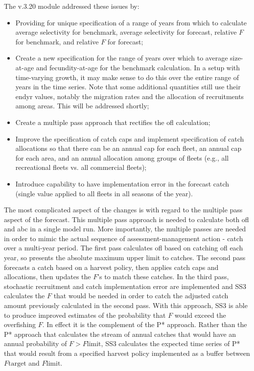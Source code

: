 The v.3.20 module addressed these issues by:
\begin{itemize}
	\item Providing for unique specification of a range of years from which to calculate average selectivity for benchmark, average selectivity for forecast, relative $F$ for benchmark, and relative $F$ for forecast;
	\item Create a new specification for the range of years over which to average size-at-age and fecundity-at-age for the benchmark calculation. In a setup with time-varying growth, it may make sense to do this over the entire range of years in the time series. Note that some additional quantities still use their endyr values, notably the migration rates and the allocation of recruitments among areas. This will be addressed shortly;
	\item Create a multiple pass approach that rectifies the \gls{ofl} calculation;
	\item Improve the specification of catch caps and implement specification of catch allocations so that there can be an annual cap for each fleet, an annual cap for each area, and an annual allocation among groups of fleets (e.g., all recreational fleets vs. all commercial fleets);
	\item Introduce capability to have implementation error in the forecast catch (single value applied to all fleets in all seasons of the year).
\end{itemize}

The most complicated aspect of the changes is with regard to the multiple pass aspect of the forecast. This multiple pass approach is needed to calculate both \gls{ofl} and \gls{abc} in a single model run. More importantly, the multiple passes are needed in order to mimic the actual sequence of assessment-management action - catch over a multi-year period. The first pass calculates \gls{ofl} based on catching \gls{ofl} each year, so presents the absolute maximum upper limit to catches. The second pass forecasts a catch based on a harvest policy, then applies catch caps and allocations, then updates the $F$'s to match these catches. In the third pass, stochastic recruitment and catch implementation error are implemented and SS3 calculates the $F$ that would be needed in order to catch the adjusted catch amount previously calculated in the second pass. With this approach, SS3 is able to produce improved estimates of the probability that $F$ would exceed the overfishing $F$. In effect it is the complement of the P* approach. Rather than the P* approach that calculates the stream of annual catches that would have an annual probability of $F > F\text{limit}$, SS3 calculates the expected time series of P* that would result from a specified harvest policy implemented as a buffer between $F\text{target}$ and $F\text{limit}$.

